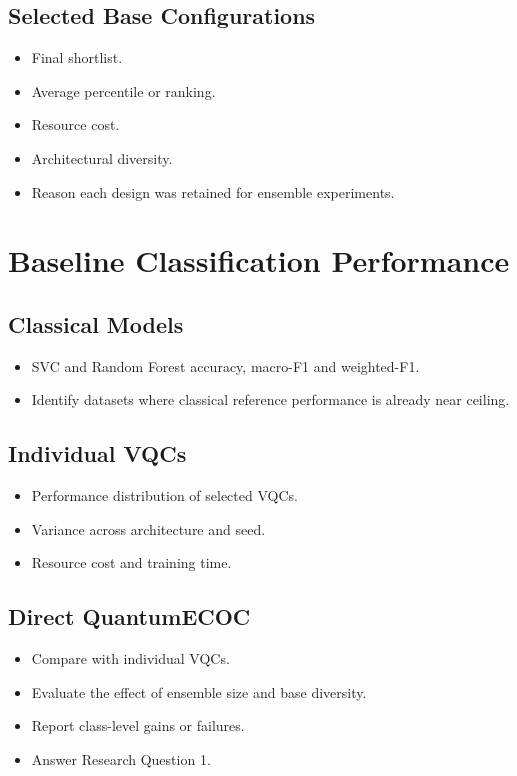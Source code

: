 \documentclass[]{UCD_CS_MSc_AAI_Report}
\begin{document}
\subsection{Selected Base Configurations}
\begin{itemize}
    \item Final shortlist.
    \item Average percentile or ranking.
    \item Resource cost.
    \item Architectural diversity.
    \item Reason each design was retained for ensemble experiments.
\end{itemize}

\section{Baseline Classification Performance}
\label{sec:results-baselines}

\subsection{Classical Models}
\begin{itemize}
    \item SVC and Random Forest accuracy, macro-F1 and weighted-F1.
    \item Identify datasets where classical reference performance is already near ceiling.
\end{itemize}

\subsection{Individual VQCs}
\begin{itemize}
    \item Performance distribution of selected VQCs.
    \item Variance across architecture and seed.
    \item Resource cost and training time.
\end{itemize}

\subsection{Direct QuantumECOC}
\begin{itemize}
    \item Compare with individual VQCs.
    \item Evaluate the effect of ensemble size and base diversity.
    \item Report class-level gains or failures.
    \item Answer Research Question 1.
\end{itemize}
\end{document}
